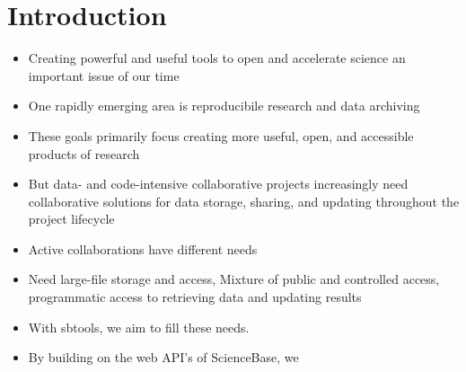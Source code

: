 \section{Introduction}

\begin{itemize}
	\item{Creating powerful and useful tools to open and accelerate science an important issue of our time}
	\item{One rapidly emerging area is reproducibile research and data archiving}
	\item{These goals primarily focus creating more useful, open, and accessible products of research}
	\item{But data- and code-intensive collaborative projects increasingly need collaborative solutions for data storage, sharing, and updating throughout the project lifecycle}
	\item{Active collaborations have different needs}
	\item{Need large-file storage and access, Mixture of public and controlled access, programmatic access to retrieving data and updating results}
	\item{With sbtools, we aim to fill these needs.}
	\item{By building on the web API's of ScienceBase, we }
	
\end{itemize}
